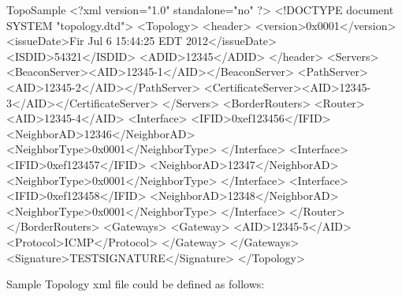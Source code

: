 \begin{SaveVerbatim}{TopoSample}
<?xml version="1.0" standalone="no" ?>
<!DOCTYPE document SYSTEM "topology.dtd">
<Topology>
	<header>
		<version>0x0001</version>
		<issueDate>Fir Jul 6 15:44:25 EDT 2012</issueDate>
		<ISDID>54321</ISDID>
		<ADID>12345</ADID>
	</header>
	<Servers>
		<BeaconServer><AID>12345-1</AID></BeaconServer>
		<PathServer><AID>12345-2</AID></PathServer>
		<CertificateServer><AID>12345-3</AID></CertificateServer>
	</Servers>
	<BorderRouters>
		<Router>	
			<AID>12345-4</AID>
			<Interface>
				<IFID>0xef123456</IFID>
				<NeighborAD>12346</NeighborAD>
				<NeighborType>0x0001</NeighborType>
			</Interface>
			<Interface>
				<IFID>0xef123457</IFID>
				<NeighborAD>12347</NeighborAD>
				<NeighborType>0x0001</NeighborType>
			</Interface>
			<Interface>
				<IFID>0xef123458</IFID>
				<NeighborAD>12348</NeighborAD>
				<NeighborType>0x0001</NeighborType>
			</Interface>
		</Router>
	</BorderRouters>
	<Gateways>
		<Gateway>
			<AID>12345-5</AID>
			<Protocol>ICMP</Protocol>
		</Gateway>
	</Gateways>
	<Signature>TESTSIGNATURE</Signature>
</Topology>
\end{SaveVerbatim}

Sample Topology xml file could be defined as follows:

